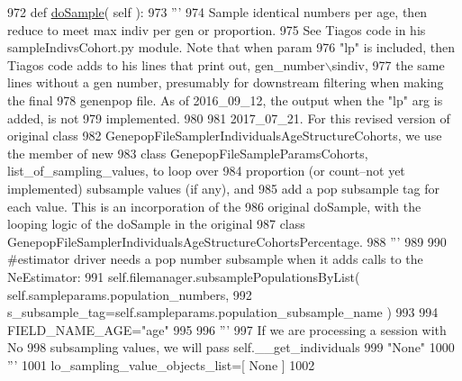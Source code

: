 \begin{DoxyCode}
972     \textcolor{keyword}{def }\hyperlink{classnegui_1_1genepopfilesampler_1_1GenepopFileSamplerCohorts_a36977cef305c268768a1ede56ab7fc63}{doSample}( self ):
973         \textcolor{stringliteral}{'''}
974 \textcolor{stringliteral}{        Sample identical numbers per age, then reduce to meet max indiv per gen or proportion.  }
975 \textcolor{stringliteral}{        See Tiagos code in his sampleIndivsCohort.py module.  Note that when param }
976 \textcolor{stringliteral}{        "lp" is included, then Tiagos code adds to his lines that print out, gen\_number\(\backslash\)sindiv, }
977 \textcolor{stringliteral}{        the same lines without a gen number, presumably for downstream filtering when making the final}
978 \textcolor{stringliteral}{        genenpop file. As of 2016\_09\_12, the output when the "lp" arg is added, is not }
979 \textcolor{stringliteral}{        implemented.}
980 \textcolor{stringliteral}{}
981 \textcolor{stringliteral}{        2017\_07\_21. For this revised version of original class }
982 \textcolor{stringliteral}{        GenepopFileSamplerIndividualsAgeStructureCohorts, we use the member of new }
983 \textcolor{stringliteral}{        class GenepopFileSampleParamsCohorts, list\_of\_sampling\_values, to loop over}
984 \textcolor{stringliteral}{        proportion (or count--not yet implemented) subsample values (if any), and }
985 \textcolor{stringliteral}{        add a pop subsample tag for each value.  This is an incorporation of the }
986 \textcolor{stringliteral}{        original doSample, with the looping logic of the doSample in the original}
987 \textcolor{stringliteral}{        class GenepopFileSamplerIndividualsAgeStructureCohortsPercentage.}
988 \textcolor{stringliteral}{        '''}
989 
990         \textcolor{comment}{#estimator driver needs a pop number subsample when it adds calls to the NeEstimator:}
991         self.filemanager.subsamplePopulationsByList( self.sampleparams.population\_numbers,
992                                         s\_subsample\_tag=self.sampleparams.population\_subsample\_name )
993 
994         FIELD\_NAME\_AGE=\textcolor{stringliteral}{"age"}
995 
996         \textcolor{stringliteral}{'''}
997 \textcolor{stringliteral}{        If we are processing a session with No }
998 \textcolor{stringliteral}{        subsampling values, we will pass self.\_\_get\_individuals}
999 \textcolor{stringliteral}{        "None"}
1000 \textcolor{stringliteral}{        '''}
1001         lo\_sampling\_value\_objects\_list=[ \textcolor{keywordtype}{None} ]
1002 

\end{DoxyCode}
